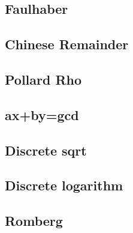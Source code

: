 \documentclass[a4paper,10pt,twocolumn,oneside]{article}
\begin{document}
\subsection{Faulhaber}


\subsection{Chinese Remainder}


\subsection{Pollard Rho}


%

%

\subsection{ax+by=gcd}


\subsection{Discrete sqrt}


\subsection{Discrete logarithm}


%

\subsection{Romberg}

\end{document}
